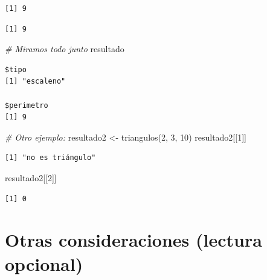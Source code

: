 \documentclass[
]{book}
\newenvironment{Shaded}{\begin{snugshade}}{\end{snugshade}}
\newcommand{\CommentTok}[1]{\textcolor[rgb]{0.56,0.35,0.01}{\textit{#1}}}
\newcommand{\DecValTok}[1]{\textcolor[rgb]{0.00,0.00,0.81}{#1}}
\newcommand{\FunctionTok}[1]{\textcolor[rgb]{0.00,0.00,0.00}{#1}}
\newcommand{\NormalTok}[1]{#1}
\newcommand{\OtherTok}[1]{\textcolor[rgb]{0.56,0.35,0.01}{#1}}
\newcommand{\SpecialCharTok}[1]{\textcolor[rgb]{0.00,0.00,0.00}{#1}}
\begin{document}
\begin{verbatim}
[1] 9
\end{verbatim}

\begin{Shaded}
\end{Shaded}

\begin{verbatim}
[1] 9
\end{verbatim}

\begin{Shaded}
\begin{Highlighting}[]
\CommentTok{\# Miramos todo junto}
\NormalTok{resultado}
\end{Highlighting}
\end{Shaded}

\begin{verbatim}
$tipo
[1] "escaleno"

$perimetro
[1] 9
\end{verbatim}

\begin{Shaded}
\begin{Highlighting}[]
\CommentTok{\# Otro ejemplo:}
\NormalTok{resultado2 }\OtherTok{\textless{}{-}} \FunctionTok{triangulos}\NormalTok{(}\DecValTok{2}\NormalTok{, }\DecValTok{3}\NormalTok{, }\DecValTok{10}\NormalTok{)}
\NormalTok{resultado2[[}\DecValTok{1}\NormalTok{]]}
\end{Highlighting}
\end{Shaded}

\begin{verbatim}
[1] "no es triángulo"
\end{verbatim}

\begin{Shaded}
\begin{Highlighting}[]
\NormalTok{resultado2[[}\DecValTok{2}\NormalTok{]]}
\end{Highlighting}
\end{Shaded}

\begin{verbatim}
[1] 0
\end{verbatim}

\hypertarget{otras-consideraciones-lectura-opcional}{%
\section{Otras consideraciones (lectura opcional)}\label{otras-consideraciones-lectura-opcional}}
\end{document}
